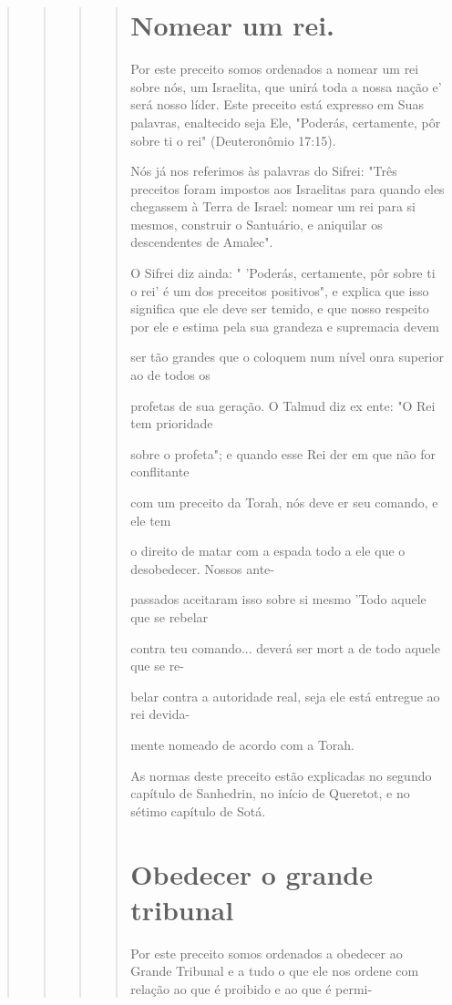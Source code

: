 \begin{quote}
\begin{quote}
\begin{quote}
\begin{quote}
\section{Nomear um rei.}

Por este preceito somos ordenados a nomear um rei sobre nós, um
Israelita, que unirá toda a nossa nação e' será nosso líder. Este
preceito está ex­presso em Suas palavras, enaltecido seja Ele, "Poderás,
certamente, pôr sobre ti o rei" (Deuteronômio 17:15).

Nós já nos referimos às palavras do Sifrei: "Três preceitos foram
im­postos aos Israelitas para quando eles chegassem à Terra de Israel:
nomear um rei para si mesmos, construir o Santuário, e aniquilar os
descendentes de Amalec".

O Sifrei diz ainda: " 'Poderás, certamente, pôr sobre ti o rei' é um dos
preceitos positivos", e explica que isso significa que ele deve ser
temido, e que nosso respeito por ele e estima pela sua grandeza e
supremacia devem

ser tão grandes que o coloquem num nível onra superior ao de todos os

profetas de sua geração. O Talmud diz ex ente: "O Rei tem prioridade

sobre o profeta"; e quando esse Rei der em que não for conflitante

com um preceito da Torah, nós deve er seu comando, e ele tem

o direito de matar com a espada todo a ele que o desobedecer. Nossos
ante-

passados aceitaram isso sobre si mesmo 'Todo aquele que se rebelar

contra teu comando... deverá ser mort a de todo aquele que se re-

belar contra a autoridade real, seja ele está entregue ao rei devida-

mente nomeado de acordo com a Torah.

As normas deste preceito estão explicadas no segundo capítulo de
Sanhedrin, no início de Queretot, e no sétimo capítulo de Sotá.

\section{Obedecer o grande tribunal}

Por este preceito somos ordenados a obedecer ao Grande Tribunal e a tudo
o que ele nos ordene com relação ao que é proibido e ao que é permi-




\end{quote}
\end{quote}
\end{quote}
\end{quote}
